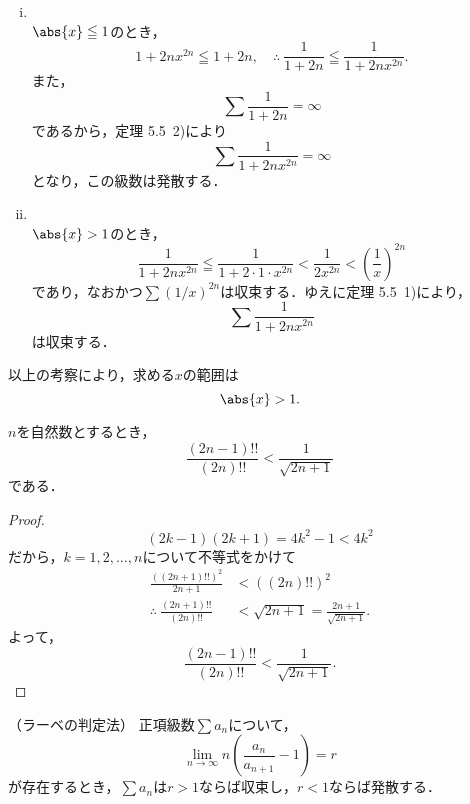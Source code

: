 
\begin{tanswer}
    \begin{enumerate}[(i)]
        \item \mbox{　} \\
              $\abs{x} \leqq 1$のとき，
              \[
                  1 + 2nx^{2n} \leqq 1+2n ,\quad \therefore ~ \frac{1}{1+2n} \leqq \frac{1}{1+2nx^{2n}}.
              \]
              また，
              \[
                  \sum \frac{1}{1+2n} =\infty
              \]
              であるから，定理 5.5~2)により
              \[
                  \sum \frac{1}{1+2nx^{2n}} = \infty
              \]
              となり，この級数は発散する．
        \item \mbox{　}\\
              $\abs{x}>1$のとき，
              \[
                  \frac{1}{1+2n x^{2n}} \leqq \frac{1}{1+2 \cdot 1 \cdot x^{2n}} < \frac{1}{2x^{2n}} <\left( \frac{1}{x} \right)^{2n}
              \]
              であり，なおかつ$\sum ( 1/x )^{2n}$は収束する．ゆえに定理 5.5~1)により，
              \[
                  \sum \frac{1}{1+2nx^{2n}}
              \]
              は収束する．
    \end{enumerate}
    以上の考察により，求める$x$の範囲は
    \[
        \abs{x}>1.
    \]
\end{tanswer}




\begin{lemma}{}{}

    $n$を自然数とするとき，
    \[
        \frac{(2n-1)!!}{(2n)!!} < \frac{1}{\sqrt{2n+1}}
    \]
    である．
\end{lemma}

\begin{proof}
    \[
        (2k-1)(2k+1)  = 4k^2-1 < 4k^2
    \]
    だから，$ k=1,2,\ldots,n$について不等式をかけて
    \begin{align*}
        \frac{((2n+1)!!)^2}{2n+1}            & < ((2n)!!)^2                            \\
        \therefore ~ \frac{(2n+1)!!}{(2n)!!} & < \sqrt{2n+1}=\frac{2n+1}{\sqrt{2n+1}}.
    \end{align*}
    よって，
    \[
        \frac{(2n-1)!!}{(2n)!!} < \frac{1}{\sqrt{2n+1}}.
    \]
\end{proof}

\begin{lemma}{（ラーベの判定法）}{}
    正項級数$\sum a_n$について，
    \[
        \lim_{n\to\infty} n \left(\frac{a_n}{a_{n+1}}-1 \right) = r
    \]
    が存在するとき，$\sum a_n$は$r >1$ならば収束し，$r < 1$ならば発散する．
\end{lemma}

